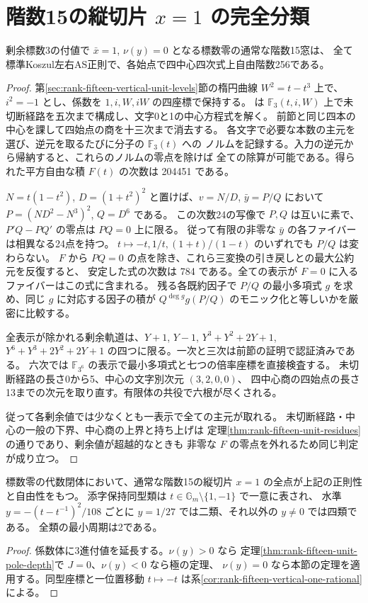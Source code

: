 \section{階数15の縦切片 $x=1$ の完全分類}
\label{sec:rank-fifteen-vertical-all-levels}
\begin{theorem}\label{thm:rank-fifteen-vertical-all-levels}
剰余標数3の付値で $\bar x=1$, $\nu(y)=0$ となる標数零の通常な階数15窓は、
全て標準Koszul左右AS正則で、各始点で四中心四次式上自由階数256である。
\end{theorem}
\begin{proof}
第\ref{sec:rank-fifteen-vertical-unit-levels}節の楕円曲線 $W^2=t-t^3$ 上で、
$i^2=-1$ とし、係数を $1,i,W,iW$ の四座標で保持する。
 は
$\mathbb F_3(t,i,W)$ 上で未切断経路を五次まで構成し、文字0と1の中心方程式を解く。
前節と同じ四本の中心を課して四始点の商を十三次まで消去する。
各文字で必要な本数の主元を選び、逆元を取るたびに分子の $\mathbb F_3(t)$ への
ノルムを記録する。入力の逆元から帰納すると、これらのノルムの零点を除けば
全ての除算が可能である。得られた平方自由な積 $F(t)$ の次数は 204451 である。

$N=t(1-t^2)$, $D=(1+t^2)^2$ と置けば、$v=N/D$,
$\bar y=P/Q$ において $P=(ND^2-N^3)^2$, $Q=D^6$ である。
この次数24の写像で $P,Q$ は互いに素で、$P'Q-PQ'$ の零点は $PQ=0$ 上に限る。
従って有限の非零な $\bar y$ の各ファイバーは相異なる24点を持つ。
$t\mapsto-t,1/t,(1+t)/(1-t)$ のいずれでも $P/Q$ は変わらない。
$F$ から $PQ=0$ の点を除き、これら三変換の引き戻しとの最大公約元を反復すると、
安定した式の次数は 784 である。全ての表示が $F=0$ に入るファイバーはこの式に含まれる。
残る各既約因子で $P/Q$ の最小多項式 $g$ を求め、同じ $g$ に対応する因子の積が
$Q^{\deg g}g(P/Q)$ のモニック化と等しいかを厳密に比較する。

全表示が除かれる剰余軌道は、$Y+1$, $Y-1$, $Y^3+Y^2+2Y+1$,
$Y^6+Y^3+2Y^2+2Y+1$ の四つに限る。一次と三次は前節の証明で認証済みである。
六次では $\mathbb F_{3^6}$ の表示で最小多項式と七つの倍率座標を直接検査する。
未切断経路の長さ0から5、中心の文字別次元 $(3,2,0,0)$、
四中心商の四始点の長さ13までの次元を取り直す。有限体の共役で六根が尽くされる。

従って各剰余値では少なくとも一表示で全ての主元が取れる。
未切断経路・中心の一般の下界、中心商の上界と持ち上げは
定理\ref{thm:rank-fifteen-unit-residues}の通りであり、剰余値が超越的なときも
非零な $F$ の零点を外れるため同じ判定が成り立つ。
\end{proof}

\begin{corollary}
標数零の代数閉体において、通常な階数15の縦切片 $x=1$ の全点が上記の正則性と自由性をもつ。
添字保持同型類は $t\in\mathbb G_m\setminus\{1,-1\}$ で一意に表され、
水準 $y=-(t-t^{-1})^2/108$ ごとに $y=1/27$ では二類、それ以外の $y\ne0$ では四類である。
全類の最小周期は2である。
\end{corollary}
\begin{proof}
係数体に3進付値を延長する。$\nu(y)>0$ なら
定理\ref{thm:rank-fifteen-unit-pole-depth}で $J=0$、$\nu(y)<0$ なら極の定理、
$\nu(y)=0$ なら本節の定理を適用する。同型座標と一位置移動
$t\mapsto-t$ は系\ref{cor:rank-fifteen-vertical-one-rational}による。
\end{proof}
